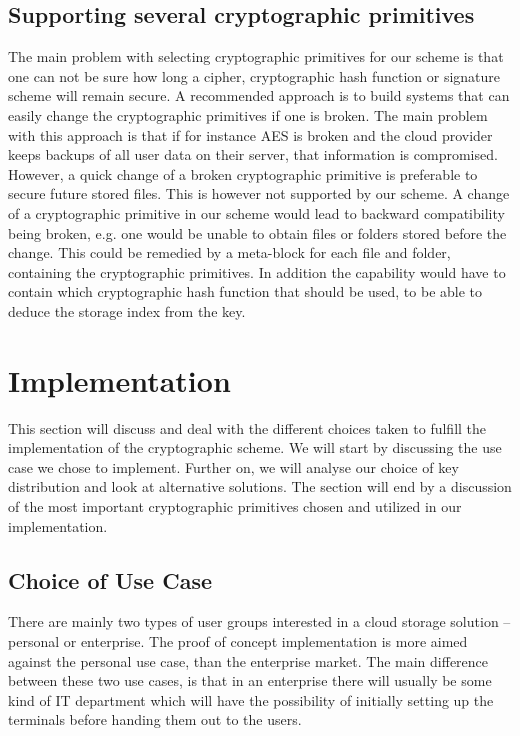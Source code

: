 \documentclass[pdftex,english,10pt,b5paper,twoside]{book}
\begin{document}
\subsection{Supporting several cryptographic primitives} The main problem with
selecting cryptographic primitives for our scheme is that one can not be sure
how long a cipher, cryptographic hash function or signature scheme will remain
secure. A recommended approach is to build systems that can easily change the
cryptographic primitives if one is broken\cite{schneier}. The main problem with
this approach is that if for instance \ac{AES} is broken and the cloud provider
keeps backups of all user data on their server, that information is
compromised. However, a quick change of a broken cryptographic primitive is
preferable to secure future stored files. This is however not supported by our
scheme.  A change of a cryptographic primitive in our scheme would lead to
backward compatibility being broken, e.g. one would be unable to obtain files
or folders stored before the change. This could be remedied by a meta-block for
each file and folder, containing the cryptographic primitives. In addition the
capability would have to contain which cryptographic hash function that should
be used, to be able to deduce the storage index from the key.

\section{Implementation}
\label{sec:DIS:impl}

This section will discuss and deal with the different choices taken to fulfill
the implementation of the cryptographic scheme. We will start by discussing the
use case we chose to implement. Further on, we will analyse our choice of key
distribution and look at alternative solutions. The section will end by a
discussion of the most important cryptographic primitives chosen and utilized
in our implementation.

\subsection{Choice of Use Case}

There are mainly two types of user groups interested in a cloud storage
solution -- personal or enterprise. The proof of concept implementation is more
aimed against the personal use case, than the enterprise market. The main
difference between these two use cases, is that in an enterprise there will
usually be some kind of IT department which will have the possibility of
initially setting up the terminals before handing them out to the users.
\end{document}
